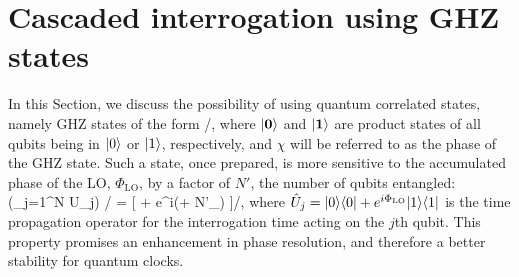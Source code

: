\section{Cascaded interrogation using GHZ states}
\label{app:GHZ_cascade}
In this Section, we discuss the possibility of using quantum correlated
states, namely GHZ states of the form
/,
\eel
where $| \mathbf{0} \rangle$ and $| \mathbf{1} \rangle$ are product states of all qubits
being in $| 0 \rangle$ or $| 1 \rangle$, respectively, and $\chi$ will be referred to as
the phase of the GHZ state. Such a state, once prepared, is more sensitive to
the accumulated phase of the LO, $\Phi_\mathrm{LO}$, by a factor of $N'$, the
number of qubits entangled:
\bel
	\left(\prod_{j=1}^N \hat U_j\right) / 
	= [ + e^{i(\chi + N'\Phi_)}
	]/,
\eel
where $\hat U_j = | 0 \rangle\langle 0 | + e^{i\Phi_\mathrm{LO}}| 1 \rangle\langle 1 |$ is the
time propagation operator for the interrogation time acting on the $j$th qubit. This property promises an
enhancement in phase resolution, and therefore a better stability for quantum clocks.

